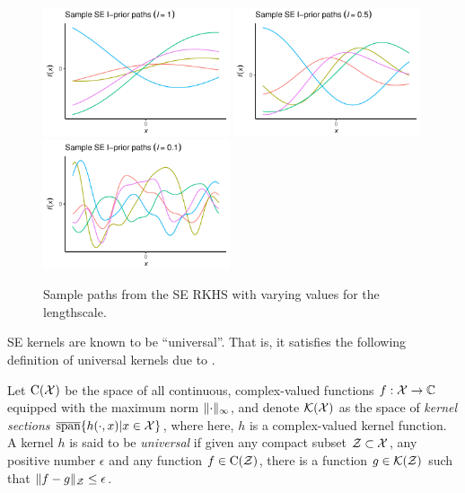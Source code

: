 \begin{figure}[hbt]
  \centering
  \includegraphics[width=0.49\textwidth]{figure/02-kernel_path_se_10}
  \includegraphics[width=0.49\textwidth]{figure/02-kernel_path_se_05}
  \includegraphics[width=0.49\textwidth]{figure/02-kernel_path_se_01}
  \caption{Sample paths from the SE RKHS with varying values for the lengthscale.}
\end{figure}

SE kernels are known to be ``universal''. That is, it satisfies the following definition of universal kernels due to \citet{micchelli2006universal}.

\begin{definition}
  Let $\text{C}({\mathcal X})$ be the space of all continuous, complex-valued functions $f:{\mathcal X}\to\mathbb{C}$ equipped with the maximum norm $\lVert\cdot\rVert_\infty$, and denote ${\mathcal K}({\mathcal X})$ as the space of \emph{kernel sections} $ \overline{\text{span}}\{ h(\cdot,x) | x \in {\mathcal X} \}$, where here, $h$ is a complex-valued kernel function.
  A kernel $h$ is said to be \emph{universal} if given any compact subset ${\mathcal Z} \subset {\mathcal X}$, any positive number $\epsilon$ and any function $f \in \text{C}({\mathcal Z})$, there is a function $g \in {\mathcal K}({\mathcal Z})$ such that $\lVert f-g\rVert_{\mathcal Z} \leq \epsilon$.
\end{definition}

